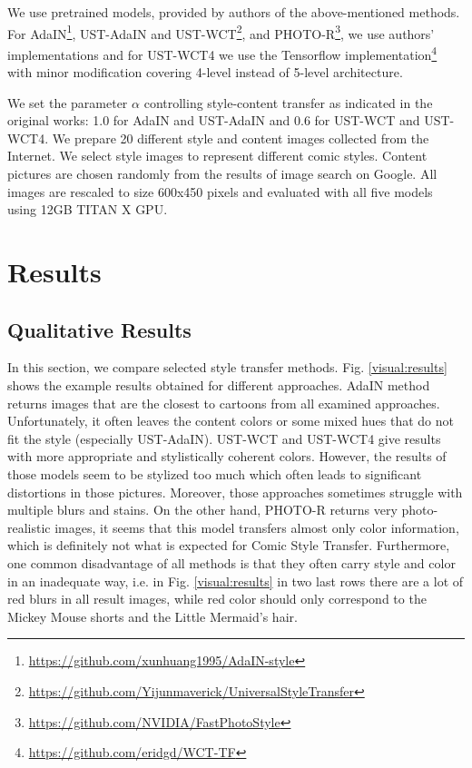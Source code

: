 \documentclass{llncs}
\begin{document}
We use pretrained models, provided by authors of the above-mentioned methods. For AdaIN\footnote{\url{https://github.com/xunhuang1995/AdaIN-style}}, UST-AdaIN and UST-WCT\footnote{\url{https://github.com/Yijunmaverick/UniversalStyleTransfer}}, and PHOTO-R\footnote{\url{https://github.com/NVIDIA/FastPhotoStyle}}, we use authors' implementations and for UST-WCT4 we use the Tensorflow implementation\footnote{\url{https://github.com/eridgd/WCT-TF}} with minor modification covering 4-level instead of 5-level architecture.%

We set the parameter $\alpha$ controlling style-content transfer as indicated in the original works: 1.0 for AdaIN and UST-AdaIN and 0.6 for UST-WCT and UST-WCT4. We prepare 20 different style and content images collected from the Internet. We select style images to represent different comic styles. Content pictures are chosen randomly from the results of image search on Google. All images are rescaled to size 600x450 pixels and evaluated with all five models using 12GB TITAN X GPU.
%
\section{Results}
%
%
\subsection{Qualitative Results}
%

In this section, we compare selected style transfer methods. Fig. \ref{visual:results} shows the example results obtained for different approaches. AdaIN method returns images that are the closest to cartoons from all examined approaches. Unfortunately, it often leaves the content colors or some mixed hues that do not fit the style (especially UST-AdaIN). UST-WCT and UST-WCT4 give results with more appropriate and stylistically coherent colors. However, the results of those models seem to be stylized too much which often leads to significant distortions in those pictures. Moreover, those approaches sometimes struggle with multiple blurs and stains. On the other hand,  PHOTO-R returns very photo-realistic images, it seems that this model transfers almost only color information, which is definitely not what is expected for Comic Style Transfer. Furthermore, one common disadvantage of all methods is that they often carry style and color in an inadequate way, i.e. in Fig. \ref{visual:results} in two last rows there are a lot of red blurs in all result images, while red color should only correspond to the Mickey Mouse shorts and the Little Mermaid's hair.
\end{document}

